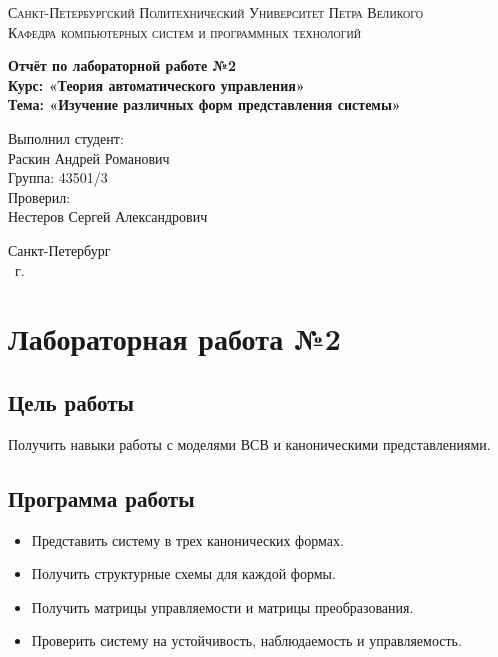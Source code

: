 \documentclass[14pt,a4paper,report]{report}
\begin{document}
\def\contentsname{Содержание}

\begin{titlepage}
	\begin{center}
		\textsc{Санкт-Петербургский Политехнический 
			Университет Петра Великого\\[5mm]
			Кафедра компьютерных систем и программных технологий}
		
		\vfill
		
		\textbf{Отчёт по лабораторной работе №2\\[3mm]
			Курс: «Теория автоматического управления»\\[3mm]
			Тема: «Изучение различных форм представления системы»\\[35mm]
			}
	\end{center}
	
	\hfill
	\begin{minipage}{.5\textwidth}
		Выполнил студент:\\[2mm] 
		Раскин Андрей Романович	\\
		Группа: 43501/3\\[5mm]
		
		Проверил:\\[2mm] 
		Нестеров Сергей Александрович
	\end{minipage}
	\vfill
	\begin{center}
		Санкт-Петербург\\ \the\year\ г.
	\end{center}
\end{titlepage}

\tableofcontents
\clearpage

\chapter{Лабораторная работа №2}

\section{Цель работы}

Получить навыки работы с моделями ВСВ и каноническими представлениями.

\section{Программа работы}

\begin{itemize}
	\item Представить систему в трех канонических формах.
	\item Получить структурные схемы для каждой формы.
	\item Получить матрицы управляемости и матрицы преобразования.
	\item Проверить систему на устойчивость, наблюдаемость и управляемость.
\end{itemize}
\end{document}
